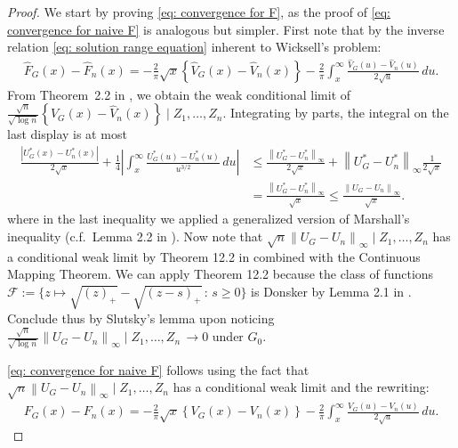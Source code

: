     \begin{proof}
		We start by proving \eqref{eq: convergence for F}, as the proof of \eqref{eq: convergence for naive F} is analogous but simpler. First note that by the inverse relation \eqref{eq: solution range equation} inherent to Wicksell's problem:
		\begin{align*}
			\hat{F}_{\scriptscriptstyle{G}}(x)-\hat{F}_n(x) = -\frac{2}{\pi} \sqrt{x}\left\{\hat{V}_{\scriptscriptstyle{G}}\left(x\right)-\hat{V}_n\left(x\right)\right\}-\frac{2}{\pi} \int_{x}^{\infty} \frac{\hat{V}_{\scriptscriptstyle{G}}(u)-\hat{V}_n(u)}{2 \sqrt{u}} \, du .
		\end{align*}
		From Theorem~2.2 in \cite{65}, we obtain the weak conditional limit of $\frac{\sqrt{n}}{\sqrt{\log{n}}}\left\{\hat{V}_{\scriptscriptstyle{G}}\left(x\right)-\hat{V}_n\left(x\right)\right\} \mid Z_1,\ldots,Z_n$. Integrating by parts, the integral on the last display is at most
		$$
		\begin{aligned}
			\frac{\left|U^*_{\scriptscriptstyle{G}}(x)-U_n^{*}(x)\right|}{2 \sqrt{x}}+\frac{1}{4}\left|\int_{x}^{\infty} \frac{U^*_{\scriptscriptstyle{G}}(u)-U_n^{*}(u)}{u^{3 / 2}} \, d u\right| &\leq \frac{\left\|U^*_{\scriptscriptstyle{G}}-U_n^{*}\right\|_{\infty}}{2 \sqrt{x}}+\left\|U^*_{\scriptscriptstyle{G}}-U_n^{*}\right\|_{\infty} \frac{1}{2 \sqrt{x}} \\
		& =\frac{\left\|U^*_{\scriptscriptstyle{G}}-U_n^{*}\right\|_{\infty}}{\sqrt{x}} \leq \frac{\left\|U_{\scriptscriptstyle{G}}-U_n\right\|_{\infty}}{\sqrt{x}}.
		\end{aligned}
		$$
		where in the last inequality we applied a generalized version of Marshall's inequality (c.f.\ Lemma 2.2 in \cite{66}). Now note that $\sqrt{n} \left\|U_{\scriptscriptstyle{G}}-U_n\right\|_{\infty} \mid Z_1,\ldots,Z_n$ has a conditional weak limit by Theorem 12.2 in \cite{4} combined with the Continuous Mapping Theorem. We can apply Theorem 12.2 because the class of functions $\mathcal{F} := \{ z \mapsto \sqrt{(z)_+} - \sqrt{(z - s)_+} \, : \, s \geq 0 \}$ is Donsker by Lemma 2.1 in \cite{27}. Conclude thus by Slutsky's lemma upon noticing $\frac{\sqrt{n}}{\sqrt{\log{n}}} \left\|U_{\scriptscriptstyle{G}}-U_n\right\|_{\infty} \mid Z_1,\ldots,Z_n \, \to 0$ under $G_0$.    

		\eqref{eq: convergence for naive F} follows using the fact that $\sqrt{n} \left\|U_{\scriptscriptstyle{G}}-U_n\right\|_{\infty} \mid Z_1,\ldots,Z_n$ has a conditional weak limit and the rewriting:
		\begin{align*}
			F_{\scriptscriptstyle{G}}(x)-F_n(x) = -\frac{2}{\pi} \sqrt{x}\left\{V_{\scriptscriptstyle{G}}\left(x\right)-V_n\left(x\right)\right\}-\frac{2}{\pi} \int_{x}^{\infty} \frac{V_{\scriptscriptstyle{G}}(u)-V_n(u)}{2 \sqrt{u}} \, du .
		\end{align*}
		

\end{proof}
